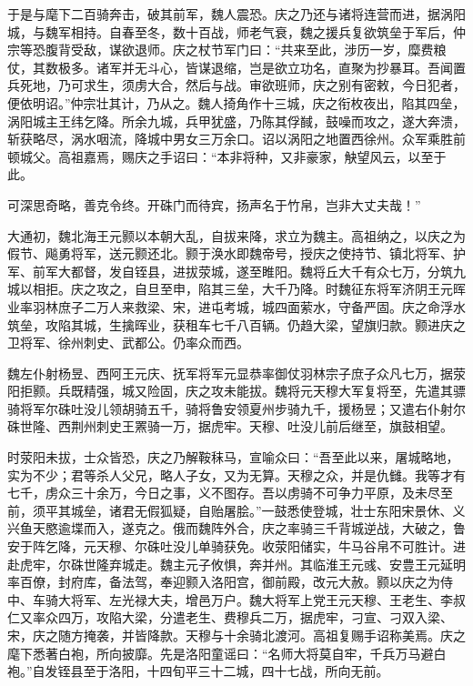 \documentclass[12pt,UTF8]{ctexbook}
\begin{document}
于是与麾下二百骑奔击，破其前军，魏人震恐。庆之乃还与诸将连营而进，据涡阳城，与魏军相持。自春至冬，数十百战，师老气衰，魏之援兵复欲筑垒于军后，仲宗等恐腹背受敌，谋欲退师。庆之杖节军门曰：“共来至此，涉历一岁，糜费粮仗，其数极多。诸军并无斗心，皆谋退缩，岂是欲立功名，直聚为抄暴耳。吾闻置兵死地，乃可求生，须虏大合，然后与战。审欲班师，庆之别有密敕，今日犯者，便依明诏。”仲宗壮其计，乃从之。魏人掎角作十三城，庆之衔枚夜出，陷其四垒，涡阳城主王纬乞降。所余九城，兵甲犹盛，乃陈其俘馘，鼓噪而攻之，遂大奔溃，斩获略尽，涡水咽流，降城中男女三万余口。诏以涡阳之地置西徐州。众军乘胜前顿城父。高祖嘉焉，赐庆之手诏曰：“本非将种，又非豪家，觖望风云，以至于此。

可深思奇略，善克令终。开硃门而待宾，扬声名于竹帛，岂非大丈夫哉！”

大通初，魏北海王元颢以本朝大乱，自拔来降，求立为魏主。高祖纳之，以庆之为假节、飚勇将军，送元颢还北。颢于涣水即魏帝号，授庆之使持节、镇北将军、护军、前军大都督，发自铚县，进拔荥城，遂至睢阳。魏将丘大千有众七万，分筑九城以相拒。庆之攻之，自旦至申，陷其三垒，大千乃降。时魏征东将军济阴王元晖业率羽林庶子二万人来救梁、宋，进屯考城，城四面萦水，守备严固。庆之命浮水筑垒，攻陷其城，生擒晖业，获租车七千八百辆。仍趋大梁，望旗归款。颢进庆之卫将军、徐州刺史、武都公。仍率众而西。

魏左仆射杨昱、西阿王元庆、抚军将军元显恭率御仗羽林宗子庶子众凡七万，据荥阳拒颢。兵既精强，城又险固，庆之攻未能拔。魏将元天穆大军复将至，先遣其骠骑将军尔硃吐没儿领胡骑五千，骑将鲁安领夏州步骑九千，援杨昱；又遣右仆射尔硃世隆、西荆州刺史王罴骑一万，据虎牢。天穆、吐没儿前后继至，旗鼓相望。

时荥阳未拔，士众皆恐，庆之乃解鞍秣马，宣喻众曰：“吾至此以来，屠城略地，实为不少；君等杀人父兄，略人子女，又为无算。天穆之众，并是仇雠。我等才有七千，虏众三十余万，今日之事，义不图存。吾以虏骑不可争力平原，及未尽至前，须平其城垒，诸君无假狐疑，自贻屠脍。”一鼓悉使登城，壮士东阳宋景休、义兴鱼天愍逾堞而入，遂克之。俄而魏阵外合，庆之率骑三千背城逆战，大破之，鲁安于阵乞降，元天穆、尔硃吐没儿单骑获免。收荥阳储实，牛马谷帛不可胜计。进赴虎牢，尔硃世隆弃城走。魏主元子攸惧，奔并州。其临淮王元彧、安豊王元延明率百僚，封府库，备法驾，奉迎颢入洛阳宫，御前殿，改元大赦。颢以庆之为侍中、车骑大将军、左光禄大夫，增邑万户。魏大将军上党王元天穆、王老生、李叔仁又率众四万，攻陷大梁，分遣老生、费穆兵二万，据虎牢，刁宣、刁双入梁、宋，庆之随方掩袭，并皆降款。天穆与十余骑北渡河。高祖复赐手诏称美焉。庆之麾下悉著白袍，所向披靡。先是洛阳童谣曰：“名师大将莫自牢，千兵万马避白袍。”自发铚县至于洛阳，十四旬平三十二城，四十七战，所向无前。
\end{document}
